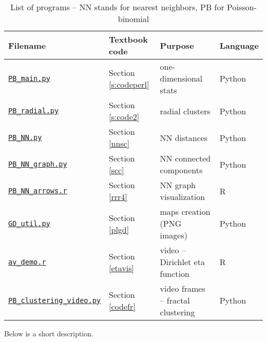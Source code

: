 \documentclass[10pt]{article}
\begin{document}
\begin{table}[H]
\begin{center}
\begin{tabular}{|l|l|l|l|}
\hline
  Filename & Textbook code & Purpose  & Language \\ %
\hline
  \href{https://github.com/VincentGranville/Point-Processes/blob/main/Source\%20Code/PB_main.py}{\texttt{PB\_main.py}} & Section \ref{s:codeperl} & one-dimensional stats &  Python \\ 

 \href{https://github.com/VincentGranville/Point-Processes/blob/main/Source\%20Code/PB_radial.py}{\texttt{PB\_radial.py}} & Section \ref{s:code2} & radial clusters &  Python \\ 

 \href{https://github.com/VincentGranville/Point-Processes/blob/main/Source\%20Code/PB_NN.py}{\texttt{PB\_NN.py}} & Section \ref{nnsc} & NN distances &  Python \\ 

\href{https://github.com/VincentGranville/Point-Processes/blob/main/Source\%20Code/PB_NN_graph.py}{\texttt{PB\_NN\_graph.py}} &  Section \ref{scc} & NN connected components &  Python \\ 

\href{https://github.com/VincentGranville/Point-Processes/blob/main/Source\%20Code/PP_NN_arrows.r}{\texttt{PB\_NN\_arrows.r}}  &  Section \ref{rrr4} & NN graph visualization &    R \\ 

 \href{https://github.com/VincentGranville/Point-Processes/blob/main/Source\%20Code/GD_util.py}{\texttt{GD\_util.py}} &  Section \ref{plgd} & maps creation (PNG images) &  Python \\ 

 \href{https://github.com/VincentGranville/Point-Processes/blob/main/Videos/av_demo.r}{\texttt{av\_demo.r}} &  Section \ref{etavis} & video -- Dirichlet eta function &  R \\ 


 \href{https://github.com/VincentGranville/Point-Processes/blob/main/Videos/PB_clustering_video.py}{\texttt{PB\_clustering\_video.py}} &  Section \ref{codefr} & video frames -- fractal clustering &  Python \\ 
\hline


\end{tabular}
\caption{\label{tabpgr}List of programs -- NN stands for nearest neighbors, PB for Poisson-binomial}
\end{center}
\end{table} 
\noindent Below is a short description. 
\end{document}
